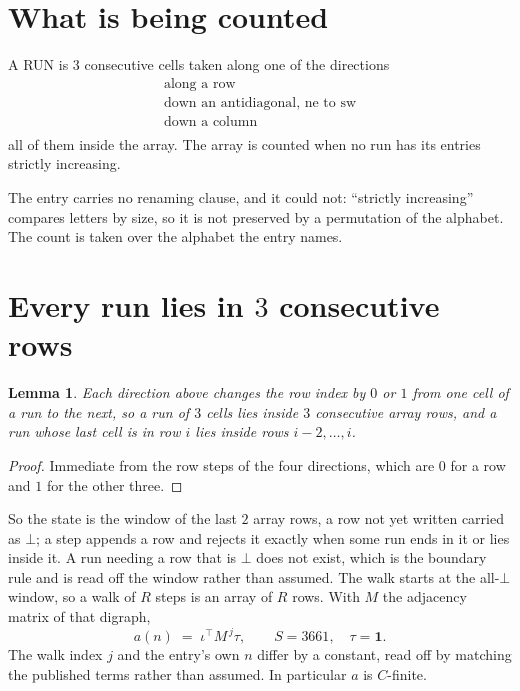 \documentclass[11pt,a4paper]{article}
\theoremstyle{plain}
\newtheorem{lemma}[theorem]{Lemma}
\theoremstyle{definition}
\begin{document}
\section{What is being counted}

A RUN is $3$ consecutive cells taken along one of the directions
\[
\begin{array}{l}
\text{along a row} \\
\text{down an antidiagonal, ne to sw} \\
\text{down a column} \\
\end{array}
\]
all of them inside the array. The array is counted when no run has its entries strictly increasing.


The entry carries no renaming clause, and it could not: ``strictly increasing'' compares
letters by size, so it is not preserved by a permutation of the alphabet. The count is taken
over the alphabet the entry names.

\section{Every run lies in $3$ consecutive rows}

\begin{lemma}\label{lem:win}
Each direction above changes the row index by $0$ or $1$ from one cell of a run to the next, so
a run of $3$ cells lies inside $3$ consecutive array rows, and a run whose last cell is in
row $i$ lies inside rows $i-2,\dots,i$.
\end{lemma}

\begin{proof}
Immediate from the row steps of the four directions, which are $0$ for a row and $1$ for the
other three.
\end{proof}

So the state is the window of the last $2$ array rows, a row not yet written carried as
$\bot$; a step appends a row and rejects it exactly when some run ends in it or lies inside it.
A run needing a row that is $\bot$ does not exist, which is the boundary rule and is read off
the window rather than assumed. The walk starts at the all-$\bot$ window, so a walk of $R$ steps
is an array of $R$ rows. With $M$ the adjacency matrix of that digraph,
\[
a(n)\;=\;\iota^{\!\top}M^{\,j}\tau ,\qquad S=3661,\quad\tau=\mathbf{1} .
\]
The walk index $j$ and the entry's own $n$ differ by a constant, read off by matching the
published terms rather than assumed. In particular $a$ is $C$-finite.
\end{document}
